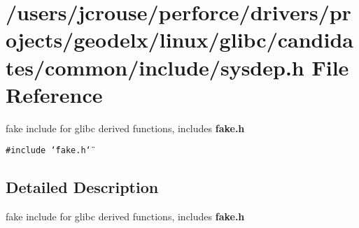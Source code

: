 \section{/users/jcrouse/perforce/drivers/projects/geodelx/linux/glibc/candidates/common/include/sysdep.h File Reference}
\label{sysdep_8h}
fake include for glibc derived functions, includes {\bf fake.h} 


{\tt \#include \char`\"{}fake.h\char`\"{}}\par


\subsection{Detailed Description}
fake include for glibc derived functions, includes {\bf fake.h}



